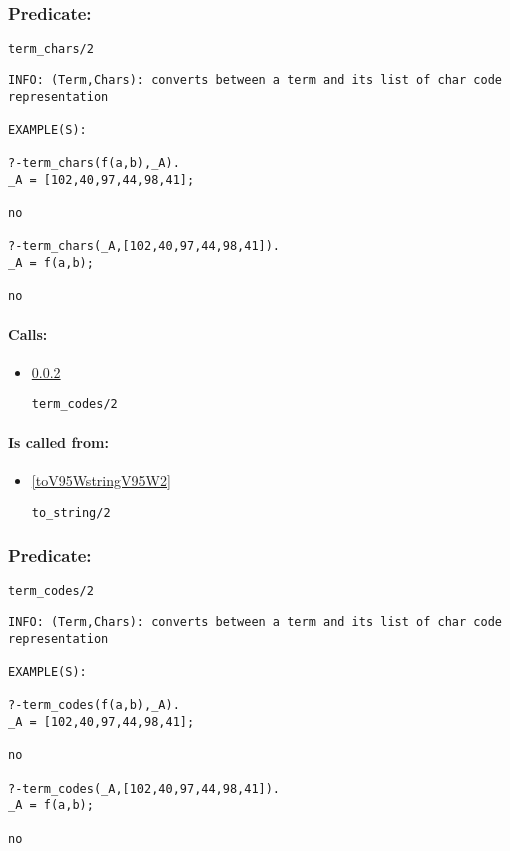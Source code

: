 \subsubsection{Predicate:} \label{termV95WcharsV95W2}

\begin{verbatim}
term_chars/2
\end{verbatim}

{\small \begin{verbatim}
INFO: (Term,Chars): converts between a term and its list of char code representation

EXAMPLE(S):

?-term_chars(f(a,b),_A).
_A = [102,40,97,44,98,41];

no

?-term_chars(_A,[102,40,97,44,98,41]).
_A = f(a,b);

no

\end{verbatim}}
\paragraph{Calls:} 
\begin{itemize}
\item \ref{termV95WcodesV95W2} 
\begin{verbatim}
term_codes/2
\end{verbatim}

\end{itemize}
\paragraph{Is called from:} 
\begin{itemize}
\item \ref{toV95WstringV95W2} 
\begin{verbatim}
to_string/2
\end{verbatim}

\end{itemize}

\subsubsection{Predicate:} \label{termV95WcodesV95W2}

\begin{verbatim}
term_codes/2
\end{verbatim}

{\small \begin{verbatim}
INFO: (Term,Chars): converts between a term and its list of char code representation

EXAMPLE(S):

?-term_codes(f(a,b),_A).
_A = [102,40,97,44,98,41];

no

?-term_codes(_A,[102,40,97,44,98,41]).
_A = f(a,b);

no

\end{verbatim}}
